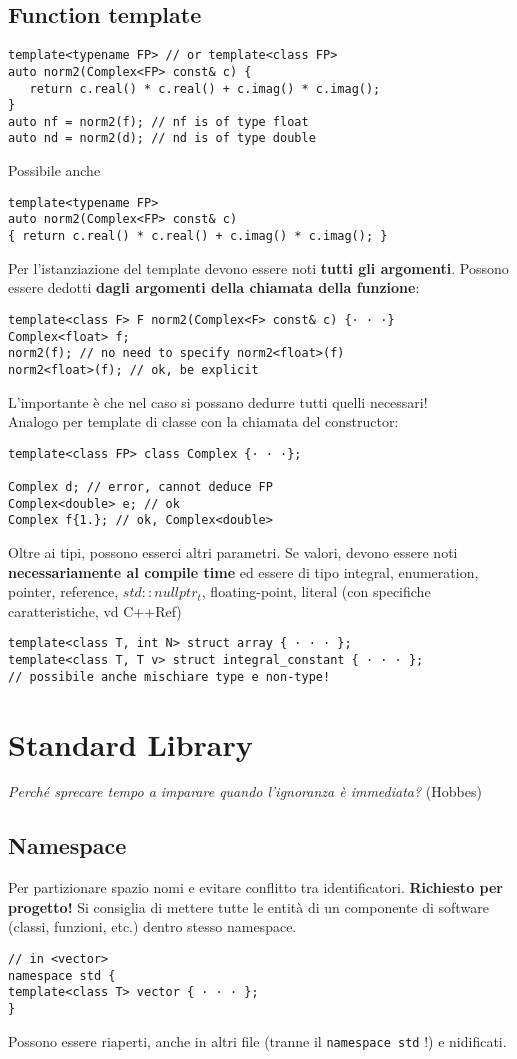 \documentclass[10pt, oneside]{Book}
\begin{document}
\section{Function template}
\begin{verbatim}
template<typename FP> // or template<class FP>
auto norm2(Complex<FP> const& c) {
   return c.real() * c.real() + c.imag() * c.imag();
}
auto nf = norm2(f); // nf is of type float
auto nd = norm2(d); // nd is of type double
\end{verbatim}
Possibile anche
\begin{verbatim}
template<typename FP>
auto norm2(Complex<FP> const& c)
{ return c.real() * c.real() + c.imag() * c.imag(); }
\end{verbatim}
Per l'istanziazione del template devono essere noti \textbf{tutti gli argomenti}. Possono essere dedotti \textbf{dagli argomenti della chiamata della funzione}:
\begin{verbatim}
template<class F> F norm2(Complex<F> const& c) {· · ·}
Complex<float> f;
norm2(f); // no need to specify norm2<float>(f)
norm2<float>(f); // ok, be explicit
\end{verbatim}
L'importante è che nel caso si possano dedurre tutti quelli necessari!
\\Analogo per template di classe con la chiamata del constructor:
\begin{verbatim}
template<class FP> class Complex {· · ·};

Complex d; // error, cannot deduce FP
Complex<double> e; // ok
Complex f{1.}; // ok, Complex<double>
\end{verbatim}
Oltre ai tipi, possono esserci altri parametri. Se valori, devono essere noti \textbf{necessariamente al compile time} ed essere di tipo integral, enumeration, pointer, reference, \texttt{$std::nullptr_t$}, floating-point, literal (con specifiche caratteristiche, vd C++Ref)
\begin{verbatim}
template<class T, int N> struct array { · · · };
template<class T, T v> struct integral_constant { · · · };
// possibile anche mischiare type e non-type!
\end{verbatim}

\chapter{Standard Library}
\textit{Perché sprecare tempo a imparare quando l'ignoranza è immediata?} (Hobbes)

\section{Namespace}
Per partizionare spazio nomi e evitare conflitto tra identificatori. \textbf{Richiesto per progetto!} Si consiglia di mettere tutte le entità di un componente di software (classi, funzioni, etc.) dentro stesso namespace.
\begin{verbatim}
// in <vector>
namespace std {
template<class T> vector { · · · };
}
\end{verbatim}
Possono essere riaperti, anche in altri file (tranne il \texttt{namespace std} !) e nidificati.
\end{document}
